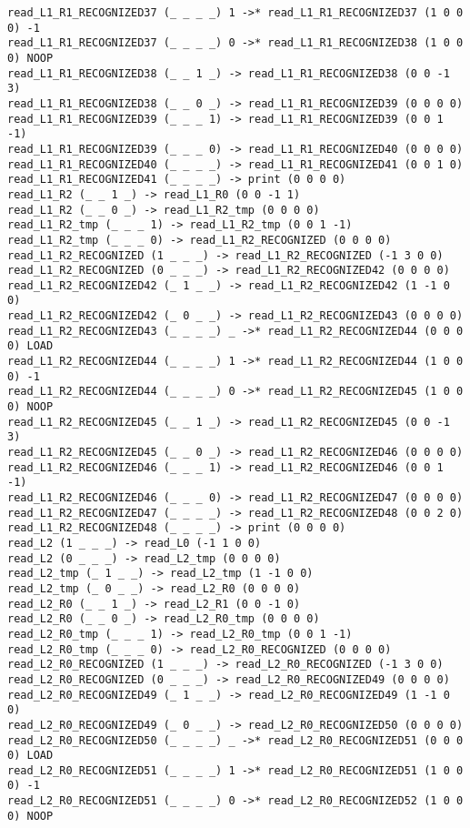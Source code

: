 \documentclass[english,shortabstract,mgr]{iithesis}
\begin{document}
\begin{verbatim}
read_L1_R1_RECOGNIZED37 (_ _ _ _) 1 ->* read_L1_R1_RECOGNIZED37 (1 0 0 0) -1
read_L1_R1_RECOGNIZED37 (_ _ _ _) 0 ->* read_L1_R1_RECOGNIZED38 (1 0 0 0) NOOP
read_L1_R1_RECOGNIZED38 (_ _ 1 _) -> read_L1_R1_RECOGNIZED38 (0 0 -1 3)
read_L1_R1_RECOGNIZED38 (_ _ 0 _) -> read_L1_R1_RECOGNIZED39 (0 0 0 0)
read_L1_R1_RECOGNIZED39 (_ _ _ 1) -> read_L1_R1_RECOGNIZED39 (0 0 1 -1)
read_L1_R1_RECOGNIZED39 (_ _ _ 0) -> read_L1_R1_RECOGNIZED40 (0 0 0 0)
read_L1_R1_RECOGNIZED40 (_ _ _ _) -> read_L1_R1_RECOGNIZED41 (0 0 1 0)
read_L1_R1_RECOGNIZED41 (_ _ _ _) -> print (0 0 0 0)
read_L1_R2 (_ _ 1 _) -> read_L1_R0 (0 0 -1 1)
read_L1_R2 (_ _ 0 _) -> read_L1_R2_tmp (0 0 0 0)
read_L1_R2_tmp (_ _ _ 1) -> read_L1_R2_tmp (0 0 1 -1)
read_L1_R2_tmp (_ _ _ 0) -> read_L1_R2_RECOGNIZED (0 0 0 0)
read_L1_R2_RECOGNIZED (1 _ _ _) -> read_L1_R2_RECOGNIZED (-1 3 0 0)
read_L1_R2_RECOGNIZED (0 _ _ _) -> read_L1_R2_RECOGNIZED42 (0 0 0 0)
read_L1_R2_RECOGNIZED42 (_ 1 _ _) -> read_L1_R2_RECOGNIZED42 (1 -1 0 0)
read_L1_R2_RECOGNIZED42 (_ 0 _ _) -> read_L1_R2_RECOGNIZED43 (0 0 0 0)
read_L1_R2_RECOGNIZED43 (_ _ _ _) _ ->* read_L1_R2_RECOGNIZED44 (0 0 0 0) LOAD
read_L1_R2_RECOGNIZED44 (_ _ _ _) 1 ->* read_L1_R2_RECOGNIZED44 (1 0 0 0) -1
read_L1_R2_RECOGNIZED44 (_ _ _ _) 0 ->* read_L1_R2_RECOGNIZED45 (1 0 0 0) NOOP
read_L1_R2_RECOGNIZED45 (_ _ 1 _) -> read_L1_R2_RECOGNIZED45 (0 0 -1 3)
read_L1_R2_RECOGNIZED45 (_ _ 0 _) -> read_L1_R2_RECOGNIZED46 (0 0 0 0)
read_L1_R2_RECOGNIZED46 (_ _ _ 1) -> read_L1_R2_RECOGNIZED46 (0 0 1 -1)
read_L1_R2_RECOGNIZED46 (_ _ _ 0) -> read_L1_R2_RECOGNIZED47 (0 0 0 0)
read_L1_R2_RECOGNIZED47 (_ _ _ _) -> read_L1_R2_RECOGNIZED48 (0 0 2 0)
read_L1_R2_RECOGNIZED48 (_ _ _ _) -> print (0 0 0 0)
read_L2 (1 _ _ _) -> read_L0 (-1 1 0 0)
read_L2 (0 _ _ _) -> read_L2_tmp (0 0 0 0)
read_L2_tmp (_ 1 _ _) -> read_L2_tmp (1 -1 0 0)
read_L2_tmp (_ 0 _ _) -> read_L2_R0 (0 0 0 0)
read_L2_R0 (_ _ 1 _) -> read_L2_R1 (0 0 -1 0)
read_L2_R0 (_ _ 0 _) -> read_L2_R0_tmp (0 0 0 0)
read_L2_R0_tmp (_ _ _ 1) -> read_L2_R0_tmp (0 0 1 -1)
read_L2_R0_tmp (_ _ _ 0) -> read_L2_R0_RECOGNIZED (0 0 0 0)
read_L2_R0_RECOGNIZED (1 _ _ _) -> read_L2_R0_RECOGNIZED (-1 3 0 0)
read_L2_R0_RECOGNIZED (0 _ _ _) -> read_L2_R0_RECOGNIZED49 (0 0 0 0)
read_L2_R0_RECOGNIZED49 (_ 1 _ _) -> read_L2_R0_RECOGNIZED49 (1 -1 0 0)
read_L2_R0_RECOGNIZED49 (_ 0 _ _) -> read_L2_R0_RECOGNIZED50 (0 0 0 0)
read_L2_R0_RECOGNIZED50 (_ _ _ _) _ ->* read_L2_R0_RECOGNIZED51 (0 0 0 0) LOAD
read_L2_R0_RECOGNIZED51 (_ _ _ _) 1 ->* read_L2_R0_RECOGNIZED51 (1 0 0 0) -1
read_L2_R0_RECOGNIZED51 (_ _ _ _) 0 ->* read_L2_R0_RECOGNIZED52 (1 0 0 0) NOOP

\end{verbatim}
\end{document}
